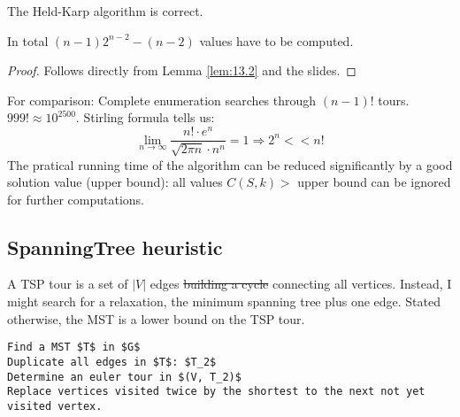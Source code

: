 \begin{thm}
The Held-Karp algorithm is correct.

In total $(n-1) 2^{n-2} - (n-2)$ values have to be computed.
\end{thm}
\begin{proof}
Follows directly from Lemma \ref{lem:13.2} and the slides.
\end{proof}

For comparison: Complete enumeration searches through $(n-1)!$ tours. $999! \approx 10^{2500}$.
Stirling formula tells us:
\[
\lim_{n \rightarrow \infty} \frac{n! \cdot e^n}{\sqrt{2 \pi n} \cdot n^n} = 1 \Rightarrow 2^n << n!
\]
The pratical running time of the algorithm can be reduced significantly by a good solution value (upper bound):
all values $C(S, k) >$ upper bound can be ignored for further computations.

\subsection*{SpanningTree heuristic}
A TSP tour is a set of $|V|$ edges \sout{building a cycle} connecting all vertices.
Instead, I might search for a relaxation, the minimum spanning tree plus one edge.
Stated otherwise, the MST is a lower bound on the TSP tour.

\begin{lstlisting}[caption=The MST heuristic is therefore]
Find a MST $T$ in $G$
Duplicate all edges in $T$: $T_2$
Determine an euler tour in $(V, T_2)$
Replace vertices visited twice by the shortest to the next not yet visited vertex.
\end{lstlisting}
